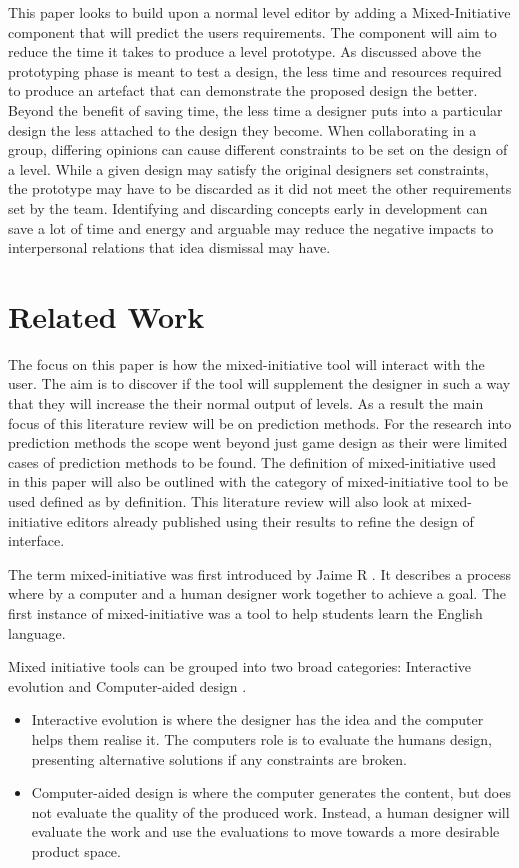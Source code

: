 \documentclass[journal]{IEEEtran}
\begin{document}
This paper looks to build upon  a normal level editor by adding a Mixed-Initiative component that will predict the users requirements. The component will aim to reduce the time it takes to produce a level prototype. As discussed above the prototyping phase is meant to test a design, the less time and resources required to produce an artefact that can demonstrate the proposed design the better. Beyond the benefit of saving time, the less time a designer puts into a particular design the less attached to the design they become. When collaborating in a group, differing opinions can cause different constraints to be set on the design of a level. While a given design may satisfy the original designers set constraints, the prototype may have to be discarded as it did not meet the other requirements set by the team. Identifying and discarding concepts early in development can save a lot of time and energy \cite[p.489]{stempfle1999thinking} and arguable may reduce the negative impacts to interpersonal relations that idea dismissal may have. 

\section{Related Work}
The focus on this paper is how the  mixed-initiative tool will interact with the user. The aim is to discover if the tool will supplement the designer in such a way that they will increase the their normal output of levels. As a result the main focus of this literature review will be on prediction methods. For the research into prediction methods the scope went beyond just game design as their were limited cases of prediction methods to be found. The definition of mixed-initiative used in this paper will also be outlined with the category of mixed-initiative tool to be used defined as by \cite{liapis2016mixed} definition. This literature review will also look at mixed-initiative editors already published using their results to refine the design of interface.

The term mixed-initiative was first introduced by Jaime R \cite{carbonell1970mixed}.
It describes a process where by a computer and a human designer work together to achieve a goal. The first instance of mixed-initiative was a tool to help students learn the English language. 

Mixed initiative tools can be grouped into two broad categories: Interactive evolution and Computer-aided design \cite{liapis2016mixed}. 
\begin{itemize}
    \item Interactive evolution is where the designer has the idea and the computer helps them realise it. The computers role is to evaluate the humans design, presenting alternative solutions if any constraints are broken. 
    
    \item Computer-aided design is where the computer generates the content, but does not evaluate the quality of the produced work. Instead, a human designer will evaluate the work and use the evaluations to move towards a more desirable product space.
\end{itemize}
\end{document}
